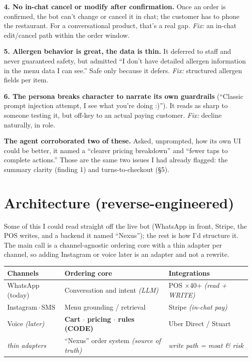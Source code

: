 \documentclass[11pt]{article}
\begin{document}
\textbf{4. No in-chat cancel or modify after confirmation.} Once an order is confirmed, the bot
can't change or cancel it in chat; the customer has to phone the restaurant. For a conversational
product, that's a real gap. \emph{Fix:} an in-chat edit/cancel path within the order window.

\textbf{5. Allergen behavior is great, the data is thin.} It deferred to staff and never guaranteed
safety, but admitted ``I don't have detailed allergen information in the menu data I can see.'' Safe
only because it defers. \emph{Fix:} structured allergen fields per item.

\textbf{6. The persona breaks character to narrate its own guardrails} (``Classic prompt injection
attempt, I see what you're doing :)''). It reads as sharp to someone testing it, but off-key to an
actual paying customer. \emph{Fix:} decline naturally, in role.

\begin{verdict}
\textbf{The agent corroborated two of these.} Asked, unprompted, how its own UI could be better, it
named a ``clearer pricing breakdown'' and ``fewer taps to complete actions.'' Those are the same two
issues I had already flagged: the summary clarity (finding 1) and turns-to-checkout (\S5).
\end{verdict}

\section{Architecture (reverse-engineered)}

Some of this I could read straight off the live bot (WhatsApp in front, Stripe, the POS writes, and a
backend it named ``Nexus''); the rest is how I'd structure it. The main call is a channel-agnostic
ordering core with a thin adapter per channel, so adding Instagram or voice later is an adapter and
not a rewrite.

\begin{center}
\renewcommand{\arraystretch}{1.2}
\begin{tabularx}{\linewidth}{@{}p{3.1cm} X p{3.4cm}@{}}
\toprule
\textbf{Channels} & \textbf{Ordering core} & \textbf{Integrations} \\
\midrule
WhatsApp (today) & Conversation and intent \emph{(LLM)} & POS $\times$40+ \emph{(read + WRITE)} \\
Instagram\,$\cdot$\,SMS & Menu grounding / retrieval & Stripe \emph{(in-chat pay)} \\
Voice \emph{(later)} & \textbf{Cart $\cdot$ pricing $\cdot$ rules (CODE)} & Uber Direct / Stuart \\
\emph{thin adapters} & ``Nexus'' order system \emph{(source of truth)} & \emph{write path = moat \& risk} \\
\bottomrule
\end{tabularx}
\end{center}
\end{document}
